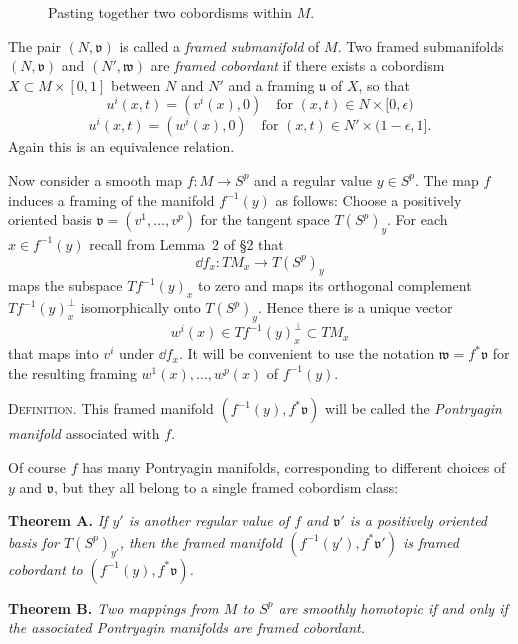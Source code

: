 
\begin{figure}[htbp]
\centering
\setcounter{figure}{14}%
\caption{Pasting together two cobordisms within $M$.}\label{fig:milnor-15}
\end{figure}

The pair $(N, \mathfrak{v})$ is called a \emph{framed submanifold} of $M$. Two framed submanifolds $(N, \mathfrak{v})$ and $(N', \mathfrak{w})$ are \emph{framed cobordant} if there exists a cobordism $X \subset M \times [0, 1]$ between $N$ and $N'$ and a framing $\mathfrak{u}$ of $X$, so that
\[
u^i(x, t) = (v^i(x), 0) \quad \text{for } (x, t) \in N \times [0, \epsilon)
\]
\[
u^i(x, t) = (w^i(x), 0) \quad \text{for } (x, t) \in N' \times (1 - \epsilon, 1].
\]
Again this is an equivalence relation.

Now consider a smooth map $f : M \to S^p$ and a regular value $y \in S^p$. The map $f$ induces a framing of the manifold $f^{-1}(y)$ as follows: Choose a positively oriented basis $\mathfrak{v} = (v^1, \ldots, v^p)$ for the tangent space $T(S^p)_y$. For each $x \in f^{-1}(y)$ recall from Lemma~2 of \S2 that
\[
\dd f_x : TM_x \to T(S^p)_y
\]
maps the subspace $Tf^{-1}(y)_x$ to zero and maps its orthogonal complement $Tf^{-1}(y)_x^\perp$ isomorphically onto $T(S^p)_y$. Hence there is a unique vector
\[
w^i(x) \in Tf^{-1}(y)_x^\perp \subset TM_x
\]
that maps into $v^i$ under $\dd f_x$. It will be convenient to use the notation $\mathfrak{w} = f^*\mathfrak{v}$ for the resulting framing $w^1(x), \ldots, w^p(x)$ of $f^{-1}(y)$.

\textsc{Definition.} This framed manifold $(f^{-1}(y), f^*\mathfrak{v})$ will be called the \emph{Pontryagin manifold} associated with $f$.

Of course $f$ has many Pontryagin manifolds, corresponding to different choices of $y$ and $\mathfrak{v}$, but they all belong to a single framed cobordism class:

\noindent\textbf{Theorem A.} \textit{If $y'$ is another regular value of $f$ and $\mathfrak{v}'$ is a positively oriented basis for $T(S^p)_{y'}$, then the framed manifold $(f^{-1}(y'), f^*\mathfrak{v}')$ is framed cobordant to $(f^{-1}(y), f^*\mathfrak{v})$.}

\noindent\textbf{Theorem B.} \textit{Two mappings from $M$ to $S^p$ are smoothly homotopic if and only if the associated Pontryagin manifolds are framed cobordant.}


